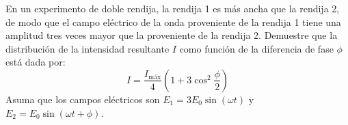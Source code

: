 \item En un experimento de doble rendija, la rendija 1 es más ancha que la rendija 2, de modo que el campo eléctrico de la onda proveniente de la rendija 1 tiene una amplitud tres veces mayor que la proveniente de la rendija 2. Demuestre que la distribución de la intensidad resultante $I$ como función de la diferencia de fase $\phi$ está dada por:
$$ I = \frac{I_{\text{máx}}}{4} \left( 1 + 3\cos^2\frac{\phi}{2} \right) $$
Asuma que los campos eléctricos son $E_1 = 3E_0 \sin(\omega t)$ y $E_2 = E_0 \sin(\omega t + \phi)$.